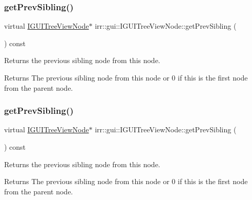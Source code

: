 \subsubsection{\texorpdfstring{get\+Prev\+Sibling()}{getPrevSibling()}\hspace{0.1cm}{\footnotesize\ttfamily [1/2]}}
{\footnotesize\ttfamily virtual \hyperlink{classirr_1_1gui_1_1IGUITreeViewNode}{I\+G\+U\+I\+Tree\+View\+Node}$\ast$ irr\+::gui\+::\+I\+G\+U\+I\+Tree\+View\+Node\+::get\+Prev\+Sibling (\begin{DoxyParamCaption}{ }\end{DoxyParamCaption}) const\hspace{0.3cm}{\ttfamily [pure virtual]}}



Returns the previous sibling node from this node. 

\begin{DoxyReturn}{Returns}
The previous sibling node from this node or 0 if this is the first node from the parent node. 
\end{DoxyReturn}
\mbox{\label{classirr_1_1gui_1_1IGUITreeViewNode_a41a756203d028a274586203091277aa9}} 
\subsubsection{\texorpdfstring{get\+Prev\+Sibling()}{getPrevSibling()}\hspace{0.1cm}{\footnotesize\ttfamily [2/2]}}
{\footnotesize\ttfamily virtual \hyperlink{classirr_1_1gui_1_1IGUITreeViewNode}{I\+G\+U\+I\+Tree\+View\+Node}$\ast$ irr\+::gui\+::\+I\+G\+U\+I\+Tree\+View\+Node\+::get\+Prev\+Sibling (\begin{DoxyParamCaption}{ }\end{DoxyParamCaption}) const\hspace{0.3cm}{\ttfamily [pure virtual]}}



Returns the previous sibling node from this node. 

\begin{DoxyReturn}{Returns}
The previous sibling node from this node or 0 if this is the first node from the parent node. 
\end{DoxyReturn}
\mbox{\label{classirr_1_1gui_1_1IGUITreeViewNode_a7a771fc86d39a62487184bc56bcf8c52}} 
